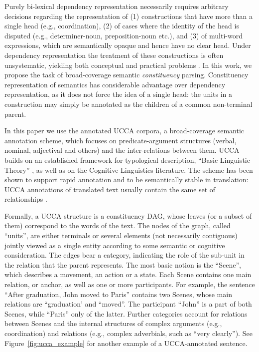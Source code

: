 \documentclass[11pt]{article}
\newcommand{\figref}[1]{Figure~\ref{#1}}
\begin{document}
Purely bi-lexical dependency representation necessarily requires arbitrary decisions
regarding the representation of (1) constructions that have more than a single
head (e.g., coordination), (2) of cases where the identity of the head is disputed
(e.g., determiner-noun, preposition-noun etc.), and (3) of multi-word expressions,
which are semantically opaque and hence have no clear head. Under dependency representation
the treatment of these constructions is often unsystematic, yielding both conceptual
and practical problems \cite{schwartz2011neutralizing,Ivanova2012who,tsarfaty2012cross}.
In this work, we propose the task of broad-coverage semantic {\it constituency} parsing. 
Constituency representation of semantics has considerable advantage over dependency
representation, as it does not force the idea of a single head: the units in a construction
may simply be annotated as the children of a common non-terminal parent. 

In this paper we use the annotated UCCA corpora, a broad-coverage semantic annotation scheme,
which focuses on predicate-argument structures (verbal, nominal, adjectival and others)
and the inter-relations between them. UCCA \cite{abend2013universal} builds on an established framework for typological description, ``Basic Linguistic Theory'' \cite{Dixon:10a,Dixon:10b,Dixon:12}, as well as on the Cognitive Linguistics literature. The scheme has been shown to support rapid annotation and to be semantically stable in translation: UCCA annotations of translated text usually contain the same set of relationships \cite{sulem2015conceptual}.

Formally, a UCCA structure is a constituency DAG, whose leaves (or a subset of them) correspond to the words of the text. The nodes of the graph, called ``units'', are either terminals or several elements (not necessarily contiguous) jointly viewed as a single entity according to some semantic or cognitive consideration. The edges bear a category, indicating the role of the sub-unit in the relation that the parent represents. 
The most basic notion is the ``Scene'', which describes a movement, an action or a state.
Each Scene contains one main relation, or anchor, as well as one or more participants. 
For example, the sentence ``After graduation, John moved to Paris'' contains two Scenes, whose main relations are ``graduation' and ``moved''. The participant ``John'' is a part of both Scenes, while ``Paris'' only of the latter. Further categories account for relations between Scenes and the internal structures of complex arguments (e.g., coordination) and relations (e.g., complex adverbials, such as ``very clearly'').
See \figref{fig:ucca_example} for another example of a UCCA-annotated sentence. 
\end{document}
